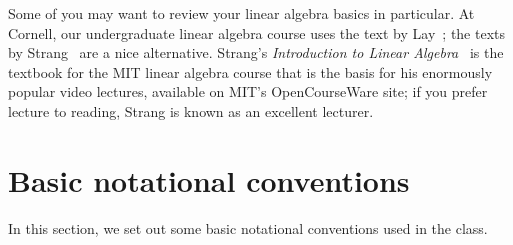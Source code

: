 \documentclass[12pt, leqno]{article}
\begin{document}
Some of you may want to review your linear algebra basics in particular.
At Cornell, our undergraduate linear algebra course uses the text
by Lay~\cite{Lay:2016:Linear}; the texts by Strang~\cite{Strang:2006:Linear,Strang:2009:Introduction} are a nice
alternative.  Strang's {\em Introduction to Linear Algebra}~\cite{Strang:2009:Introduction} is the textbook for the MIT
linear algebra course that is the basis for his enormously popular
video lectures, available on MIT's OpenCourseWare site; if you prefer
lecture to reading, Strang is known as an excellent lecturer.

\section{Basic notational conventions}

In this section, we set out some basic notational conventions used
in the class.
\end{document}
